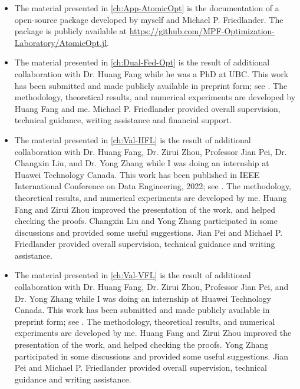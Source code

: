 \begin{itemize}
    \item The material presented in \autoref{ch:App-AtomicOpt} is the documentation of a open-source package developed by myself and Michael P. Friedlander. The package is publicly available at \url{https://github.com/MPF-Optimization-Laboratory/AtomicOpt.jl}. 
    \item The material presented in \autoref{ch:Dual-Fed-Opt} is the result of additional collaboration with Dr. Huang Fang while he was a PhD at UBC. This work has been submitted and made publicly available in preprint form; see \citet{fan2022dual}. The methodology, theoretical results, and numerical experiments are developed by Huang Fang and me. Michael P. Friedlander provided overall supervision, technical guidance, writing assistance and financial support.
    \item The material presented in \autoref{ch:Val-HFL} is the result of additional collaboration with Dr. Huang Fang, Dr. Zirui Zhou, Professor Jian Pei, Dr. Changxin Liu, and Dr. Yong Zhang while I was doing an internship at Huawei Technology Canada. This work has been published in IEEE International Conference on Data Engineering, 2022; see \citet{fan2022improving}. The methodology, theoretical results, and numerical experiments are developed by me. Huang Fang and Zirui Zhou improved the presentation of the work, and helped checking the proofs. Changxin Liu and Yong Zhang participated in some discussions and provided some useful suggestions. Jian Pei and Michael P. Friedlander provided overall supervision, technical guidance and writing assistance. 
    \item The material presented in \autoref{ch:Val-VFL} is the result of additional collaboration with Dr. Huang Fang, Dr. Zirui Zhou, Professor Jian Pei, and Dr. Yong Zhang while I was doing an internship at Huawei Technology Canada. This work has been submitted and made publicly available in preprint form; see \citet{fan2022fair}. The methodology, theoretical results, and numerical experiments are developed by me. Huang Fang and Zirui Zhou improved the presentation of the work, and helped checking the proofs. Yong Zhang participated in some discussions and provided some useful suggestions. Jian Pei and Michael P. Friedlander provided overall supervision, technical guidance and writing assistance. 
\end{itemize}




 






